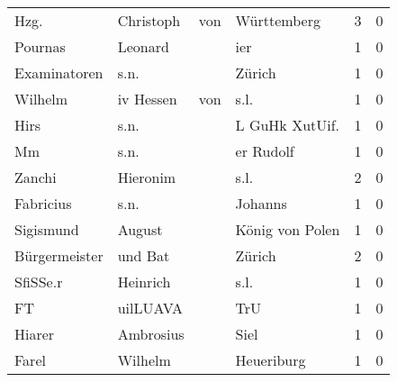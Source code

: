 \begin{center}
\begin{tiny}
\begin{longtabu}{llllrr}
                     Hzg. &                          Christoph &         von &                                 Württemberg &          3 &         0 \\
                  Pournas &                            Leonard &             &                                         ier &          1 &         0 \\
             Examinatoren &                               s.n. &             &                                      Zürich &          1 &         0 \\
                  Wilhelm &                         iv  Hessen &         von &                                        s.l. &          1 &         0 \\
                     Hirs &                               s.n. &             &                             L GuHk XutUif.  &          1 &         0 \\
                       Mm &                               s.n. &             &                                   er Rudolf &          1 &         0 \\
                   Zanchi &                           Hieronim &             &                                        s.l. &          2 &         0 \\
                Fabricius &                               s.n. &             &                                     Johanns &          1 &         0 \\
                Sigismund &                             August &             &                             König von Polen &          1 &         0 \\
            Bürgermeister &                            und Bat &             &                                      Zürich &          2 &         0 \\
                 SfiSSe.r &                           Heinrich &             &                                        s.l. &          1 &         0 \\
                       FT &                           uilLUAVA &             &                                         TrU &          1 &         0 \\
                   Hiarer &                          Ambrosius &             &                                        Siel &          1 &         0 \\
                    Farel &                            Wilhelm &             &                                  Heueriburg &          1 &         0 \\

\end{longtabu}
\end{tiny}
\end{center}
